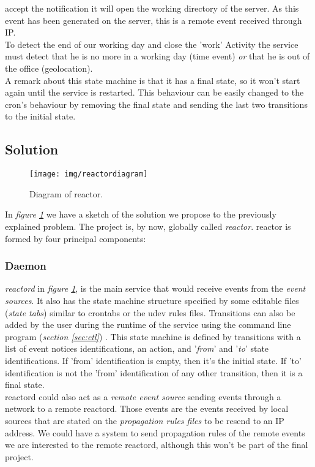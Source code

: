 \documentclass[a4paper,11pt]{article}
\begin{document}
accept the notification it will open the working directory of the server. As this event has been generated on the 
server, this is a remote event received through IP.\\
To detect the end of our working day and close the 'work' Activity the service must detect that he
is no more in a working day (time event) \emph{or} that he is out of the office (geolocation).\\
A remark about this state machine is that it has a final state, so it won't start again until the service is 
restarted. This behaviour can be easily changed to the cron's behaviour by removing the final state and sending the 
last two transitions to the initial state.
% 
% 
% 
% 
\subsection{Solution}
\begin{figure}
  \centering
    \texttt{[image: img/reactordiagram]}
  \caption{Diagram of reactor.}
  \label{fig:reactordia1}
\end{figure}
In \emph{figure \ref{fig:reactordia1}} we have a sketch of the solution we propose to the previously explained 
problem. The project is, by now, globally called \emph{reactor}. reactor is formed by four principal components:
\subsubsection{Daemon}
\emph{reactord} in \emph{figure \ref{fig:reactordia1}}, is the main service that would receive events from the 
\emph{event sources}. It also has the state machine structure specified by some editable files
\tiny(\emph{state tabs}) \normalsize similar to crontabs or the udev rules files.
Transitions can also be added by the user during the runtime of the service using the command line 
program \tiny(\emph{section \ref{sec:ctl}}) \normalsize. 
This state machine is defined by transitions with a list of event notices identifications, an action, 
and '\emph{from}' and '\emph{to}' state identifications. If 'from' identification is empty, then it's the initial 
state. If 'to' identification is not the 'from' identification of any other transition, then it is a final state.\\
reactord could also act as a \emph{remote event source} sending events through a network to a remote reactord. 
Those events are the events received by local sources that are stated on the \emph{propagation rules files} 
to be resend to an IP address. We could have a system to send propagation rules of the remote events we are 
interested to the remote reactord, although this won't be part of the final project.
\end{document}
